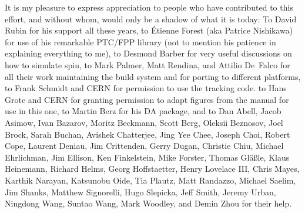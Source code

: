 It is my pleasure to express appreciation to people who have contributed to this effort, and without
whom, \bmad would only be a shadow of what it is today: To David Rubin for his support all these
years, to \'Etienne Forest (aka Patrice Nishikawa) for use of his remarkable PTC/FPP library (not to
mention his patience in explaining everything to me), to Desmond Barber for very useful discussions
on how to simulate spin, to Mark Palmer, Matt Rendina, and Attilio De~Falco for all their work
maintaining the build system and for porting \bmad to different platforms, to Frank Schmidt and CERN
for permission to use the \mad tracking code. to Hans Grote and CERN for granting permission to
adapt figures from the \mad manual for use in this one, to Martin Berz for his DA package, and to
Dan Abell, Jacob Asimow, Ivan Bazarov, Moritz Beckmann, Scott Berg, Oleksii Beznosov, Joel Brock,
Sarah Buchan, Avishek Chatterjee, Jing Yee Chee, Joseph Choi, Robert Cope, Laurent Deniau, Jim
Crittenden, Gerry Dugan, Christie Chiu, Michael Ehrlichman, Jim Ellison, Ken Finkelstein, Mike
Forster, Thomas Gl{\"a}{\ss}le, Klaus Heinemann, Richard Helms, Georg Hoffstaetter, Henry Lovelace
III, Chris Mayes, Karthik Narayan, Katsunobu Oide, Tia Plautz, Matt Randazzo, Michael Saelim, Jim
Shanks, Matthew Signorelli, Hugo Slepicka, Jeff Smith, Jeremy Urban, Ningdong Wang, Suntao Wang,
Mark Woodley, and Demin Zhou for their help.

